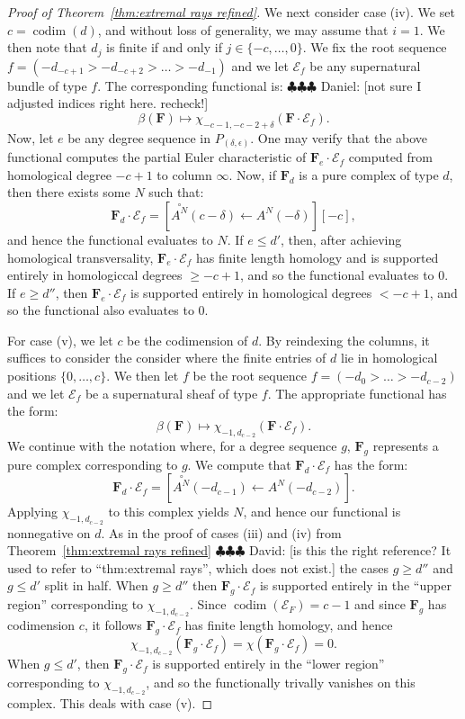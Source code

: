 \documentclass[12pt]{amsart}
\theoremstyle{definition}
\theoremstyle{remark}
\newcommand{\codim}{\operatorname{codim}}
\newcommand{\cE}{\mathcal{E}}
\newcommand{\FF}{\mathbf{F}}
\newcommand{\zp}{\circ}
\newcommand{\daniel}[1]{{\color{green} \sf $\clubsuit\clubsuit\clubsuit$ Daniel: [#1]}}
\newcommand{\david}[1]{{\color{red} \sf $\clubsuit\clubsuit\clubsuit$ David: [#1]}}
\begin{document}
\begin{proof}[Proof of Theorem~\ref{thm:extremal rays refined}]
We next consider case (iv).  We set $c=\codim(d)$, and without loss of generality, we may assume that $i=1$.  We then note that $d_j$ is finite if and only if $j\in \{-c,\dots ,0\}$.  We fix the root sequence $f=(-d_{-c+1}>-d_{-c+2}>\dots>-d_{-1})$ and we let $\cE_f$ be any supernatural bundle of type $f$.   The corresponding functional is:
\daniel{not sure I adjusted indices right here.  recheck!}
\[
\beta(\FF)\mapsto \chi_{-c-1,-c-2+\delta}(\FF\cdot \cE_f).
\]
Now, let $e$ be any degree sequence in $P_{(\delta,\epsilon)}$.  One may verify that the above functional computes the partial Euler characteristic of $\FF_e\cdot \cE_f$ computed from homological degree $-c+1$ to column $\infty$.  Now, if $\FF_d$ is a pure complex of type $d$, then there exists some $N$ such that:
\[
\FF_d\cdot \cE_f=\left[ \overset{\zp}{A^N}(c-\delta)\gets A^N(-\delta) \right][-c],
\]
and hence the functional evaluates to $N$.  If $e\leq d'$, then, after achieving homological transversality, $\FF_e\cdot \cE_f$ has finite length homology and is supported entirely in homologiccal degrees $\geq -c+1$, and so the functional evaluates to $0$.  If $e\geq d''$, then $\FF_e\cdot \cE_f$ is supported entirely in homological degrees $<-c+1$, and so the functional also evaluates to $0$.

For case (v), we let $c$ be the codimension of $d$.  By reindexing the columns, it suffices to consider the consider where the finite entries of $d$ lie in homological positions $\{0,\dots,c\}$.  We then let $f$ be the root sequence $f=(-d_0>\dots >-d_{c-2})$ and we let $\cE_f$ be a supernatural sheaf of type $f$.  The appropriate functional has the form:
\[
\beta(\FF)\mapsto \chi_{-1,d_{c-2}}(\FF\cdot \cE_f).
\]
We continue with the notation where, for a degree sequence $g$, $\FF_g$ represents a pure complex corresponding to $g$.  We compute that $\FF_d\cdot \cE_f$ has the form:
\[
\FF_d\cdot \cE_f=\left[\overset{\zp}{A^N}(-d_{c-1})\gets A^N(-d_{c-2}) \right].
\]
Applying $\chi_{-1,d_{c-2}}$ to this complex yields $N$, and hence our functional is nonnegative on $d$.  As in the proof of cases (iii) and (iv) from Theorem~\ref{thm:extremal rays refined} \david{is this the right reference? It used to refer to ``thm:extremal rays'', which does not exist.} the cases $g\geq d''$ and $g\leq d'$ split in half.  When $g\geq d''$ then $\FF_g\cdot \cE_f$ is supported entirely in the ``upper region'' corresponding to $\chi_{-1,d_{c-2}}$.  Since $\codim(\cE_F)=c-1$ and since $\FF_g$ has codimension $c$, it follows $\FF_g\cdot \cE_f$ has finite length homology, and hence
\[
\chi_{-1,d_{c-2}}(\FF_g\cdot \cE_f)=\chi(\FF_g\cdot \cE_f)=0.
\]
When $g\leq d'$, then $\FF_g\cdot \cE_f$ is supported entirely in the ``lower region'' corresponding to $\chi_{-1,d_{c-2}}$, and so the functionally trivally vanishes on this complex.  This deals with case (v).



\end{proof}
\end{document}
